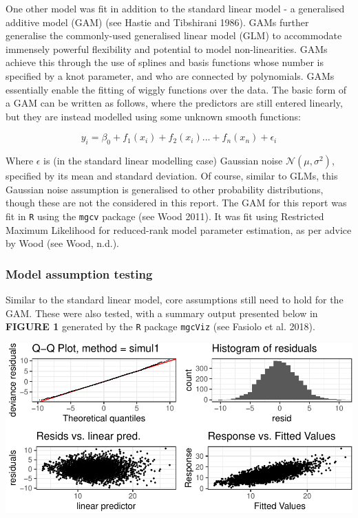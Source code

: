 \documentclass{article}
\begin{document}
One other model was fit in addition to the standard linear model - a
generalised additive model (GAM) (see Hastie and Tibshirani 1986). GAMs
further generalise the commonly-used generalised linear model (GLM) to
accommodate immensely powerful flexibility and potential to model
non-linearities. GAMs achieve this through the use of splines and basis
functions whose number is specified by a knot parameter, and who are
connected by polynomials. GAMs essentially enable the fitting of wiggly
functions over the data. The basic form of a GAM can be written as
follows, where the predictors are still entered linearly, but they are
instead modelled using some unknown smooth functions:

\[
y_i = \beta_0 + f_1(x_i) + f_2(x_i)... + f_n(x_n) + \epsilon_i
\]

Where \(\epsilon\) is (in the standard linear modelling case) Gaussian
noise \(\mathcal{N}(\mu,\sigma^2)\), specified by its mean and standard
deviation. Of course, similar to GLMs, this Gaussian noise assumption is
generalised to other probability distributions, though these are not the
considered in this report. The GAM for this report was fit in \texttt{R}
using the \texttt{mgcv} package (see Wood 2011). It was fit using
Restricted Maximum Likelihood for reduced-rank model parameter
estimation, as per advice by Wood (see Wood, n.d.).

\hypertarget{model-assumption-testing-1}{%
\subsubsection{Model assumption
testing}\label{model-assumption-testing-1}}

Similar to the standard linear model, core assumptions still need to
hold for the GAM. These were also tested, with a summary output
presented below in \textbf{FIGURE 1} generated by the \texttt{R} package
\texttt{mgcViz} (see Fasiolo et al. 2018).

\includegraphics{OLET5608_TrentHenderson_files/figure-latex/unnamed-chunk-11-1.pdf}
\end{document}
